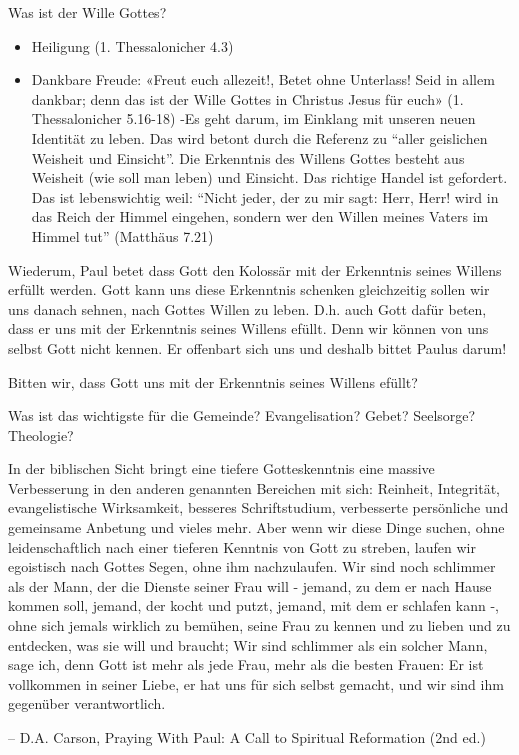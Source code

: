 \documentclass[
  12pt,
]{krantz}
\makeatletter
\providecommand{\tightlist}{%
  \setlength{\itemsep}{0pt}\setlength{\parskip}{0pt}}
\newenvironment{kframe}{%
\medskip{}
\setlength{\fboxsep}{.8em}
 \def\at@end@of@kframe{}%
 \ifinner\ifhmode%
  \def\at@end@of@kframe{\end{minipage}}%
  \begin{minipage}{\columnwidth}%
 \fi\fi%
 \def\FrameCommand##1{\hskip\@totalleftmargin \hskip-\fboxsep
 \colorbox{shadecolor}{##1}\hskip-\fboxsep
     \hskip-\linewidth \hskip-\@totalleftmargin \hskip\columnwidth}%
 \MakeFramed {\advance\hsize-\width
   \@totalleftmargin\z@ \linewidth\hsize
   \@setminipage}}%
 {\par\unskip\endMakeFramed%
 \at@end@of@kframe}
\newenvironment{rmdblock}[1]
  {
  \begin{itemize}
  \renewcommand{\labelitemi}{
    \raisebox{-.7\height}[0pt][0pt]{
      {\setkeys{Gin}{width=3em,keepaspectratio}\texttt{[image: img/\#1]}}
    }
  }
  \setlength{\fboxsep}{1em}
  \begin{kframe}
  \item
  }
  {
  \end{kframe}
  \end{itemize}
  }
\newenvironment{rmdquestion}
  {\begin{rmdblock}{question}}
  {\end{rmdblock}}
\newenvironment{rmdquote}
  {\begin{rmdblock}{quote}}
  {\end{rmdblock}}
\makeatother
\begin{document}
Was ist der Wille Gottes?

\begin{itemize}
\tightlist
\item
  Heiligung (1. Thessalonicher 4.3)
\item
  Dankbare Freude: «Freut euch allezeit!, Betet ohne Unterlass! Seid in allem dankbar; denn das ist der Wille Gottes in Christus Jesus für euch» (1. Thessalonicher 5.16-18)
  -Es geht darum, im Einklang mit unseren neuen Identität zu leben. Das wird betont durch die Referenz zu ``aller geislichen Weisheit und Einsicht''. Die Erkenntnis des Willens Gottes besteht aus Weisheit (wie soll man leben) und Einsicht. Das richtige Handel ist gefordert. Das ist lebenswichtig weil:
  ``Nicht jeder, der zu mir sagt: Herr, Herr! wird in das Reich der Himmel eingehen, sondern wer den Willen meines Vaters im Himmel tut'' (Matthäus 7.21)
\end{itemize}

Wiederum, Paul betet dass Gott den Kolossär mit der Erkenntnis seines Willens erfüllt werden. Gott kann uns diese Erkenntnis schenken gleichzeitig sollen wir uns danach sehnen, nach Gottes Willen zu leben. D.h. auch Gott dafür beten, dass er uns mit der Erkenntnis seines Willens efüllt. Denn wir können von uns selbst Gott nicht kennen. Er offenbart sich uns und deshalb bittet Paulus darum!

\begin{rmdquestion}
Bitten wir, dass Gott uns mit der Erkenntnis seines Willens efüllt?
\end{rmdquestion}

Was ist das wichtigste für die Gemeinde? Evangelisation? Gebet? Seelsorge? Theologie?

\begin{rmdquote}
In der biblischen Sicht bringt eine tiefere Gotteskenntnis eine massive
Verbesserung in den anderen genannten Bereichen mit sich: Reinheit,
Integrität, evangelistische Wirksamkeit, besseres Schriftstudium,
verbesserte persönliche und gemeinsame Anbetung und vieles mehr. Aber
wenn wir diese Dinge suchen, ohne leidenschaftlich nach einer tieferen
Kenntnis von Gott zu streben, laufen wir egoistisch nach Gottes Segen,
ohne ihm nachzulaufen. Wir sind noch schlimmer als der Mann, der die
Dienste seiner Frau will - jemand, zu dem er nach Hause kommen soll,
jemand, der kocht und putzt, jemand, mit dem er schlafen kann -, ohne
sich jemals wirklich zu bemühen, seine Frau zu kennen und zu lieben und
zu entdecken, was sie will und braucht; Wir sind schlimmer als ein
solcher Mann, sage ich, denn Gott ist mehr als jede Frau, mehr als die
besten Frauen: Er ist vollkommen in seiner Liebe, er hat uns für sich
selbst gemacht, und wir sind ihm gegenüber verantwortlich.

-- D.A. Carson, Praying With Paul: A Call to Spiritual Reformation (2nd
ed.)
\end{rmdquote}
\end{document}

